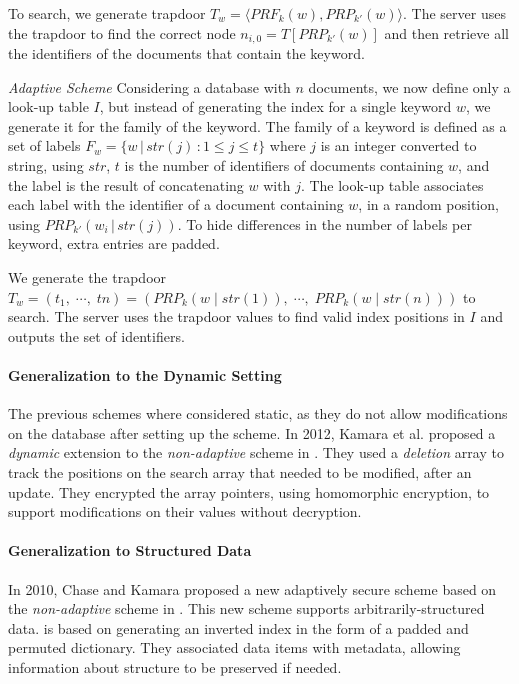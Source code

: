 To search, we generate trapdoor $T_{w}=\langle PRF_{k}(w), PRP_{k'}(w)\rangle$. The server uses the trapdoor to find the correct node $n_{i,0} = T[PRP_{k'}(w)]$ and then retrieve all the identifiers of the documents that contain the keyword.

\emph{Adaptive Scheme}  Considering a database with $n$ documents, we now define only a look-up table $I$, but instead of generating the index for a single keyword $w$, we generate it for the family of the keyword. The family of a keyword is defined as a set of labels $F_{w} = \{w \, | \, str(j) \, : 1 \leq j \leq t\}$ where $j$ is an integer converted to string, using $str$, $t$ is the number of identifiers of documents containing $w$, and the label is the result of concatenating $w$ with $j$. The look-up table associates each label with the identifier of a document containing $w$, in a random position, using $PRP_{k'}(w_{i} \, | \, str(j))$. To hide differences in the number of labels per keyword, extra entries are padded.

We generate the trapdoor $T_{w}= (t_{1},\;\cdots,\;t{n}) = (PRP_{k}(w \; | \; str(1)),\;\cdots,\;PRP_{k}(w \;|\; str(n)))$ to search. The server uses the trapdoor values to find valid index positions in $I$ and outputs the set of identifiers.

\paragraph{Generalization to the Dynamic Setting} The previous schemes where considered static, as they do not allow modifications on the database after setting up the scheme. In 2012, Kamara et al. \autocite{Kamara2012-lm} proposed a \emph{dynamic} extension to the \emph{non-adaptive} scheme in \autocite{Curtmola2011-hi}. They used a \emph{deletion} array to track the positions on the search array that needed to be modified, after an update. They encrypted the array pointers, using homomorphic encryption, to support modifications on their values without decryption.

\paragraph{Generalization to Structured Data} In 2010, Chase and Kamara \autocite{Chase2010-xx} proposed a new adaptively secure scheme based on the \emph{non-adaptive} scheme in \autocite{Curtmola2011-hi}. This new scheme supports arbitrarily-structured data.  is based on generating an inverted index in the form of a padded and permuted dictionary. They associated data items with metadata, allowing information about structure to be preserved if needed. 

